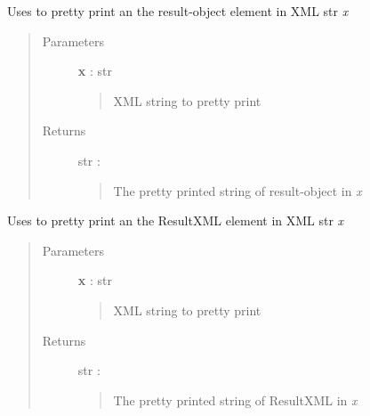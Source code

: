 \documentclass[letterpaper,10pt,english]{sphinxmanual}
\begin{document}

\begin{fulllineitems}
\label{pytan.utils:pytan.utils.xml_pretty_resultobj}
Uses {\hyperref[xmltodict:module-xmltodict]{}} to pretty print an the result-object element in XML str \emph{x}
\begin{quote}\begin{description}
\item[{Parameters}] \leavevmode
\textbf{x} : str
\begin{quote}

XML string to pretty print
\end{quote}

\item[{Returns}] \leavevmode
str :
\begin{quote}

The pretty printed string of result-object in \emph{x}
\end{quote}

\end{description}\end{quote}

\end{fulllineitems}


\begin{fulllineitems}
\label{pytan.utils:pytan.utils.xml_pretty_resultxml}
Uses {\hyperref[xmltodict:module-xmltodict]{}} to pretty print an the ResultXML element in XML str \emph{x}
\begin{quote}\begin{description}
\item[{Parameters}] \leavevmode
\textbf{x} : str
\begin{quote}

XML string to pretty print
\end{quote}

\item[{Returns}] \leavevmode
str :
\begin{quote}

The pretty printed string of ResultXML in \emph{x}
\end{quote}

\end{description}\end{quote}

\end{fulllineitems}
\end{document}
